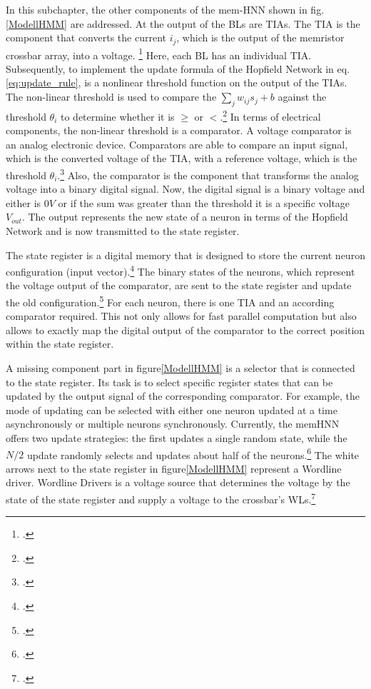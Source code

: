 In this subchapter, the other components of the \ac{mem-HNN} shown in fig.\ref{ModellHMM} are addressed.
At the output of the BLs are \ac{TIA}s.
The \ac{TIA} is the component that converts the current \(i_j\), which is the output of the memristor crossbar array, into a voltage. \footcite[cf.][3]{hizzaniMemristorbasedHardwareAlgorithms2023}
Here, each BL has an individual \ac{TIA}.
Subsequently, to implement the update formula of the Hopfield Network in eq.\eqref{eq:update_rule}, is a nonlinear threshold function on the output of the \ac{TIA}s.
The non-linear threshold is used to compare the \(\sum_j w_{ij} s_j + b\) against the threshold \(\theta_i\) to determine whether it is \(\geq\) or \(<\).\footcite[cf.][18]{caiHarnessingIntrinsicNoise2019}
In terms of electrical components, the non-linear threshold is a comparator. 
A voltage comparator is an analog electronic device.
Comparators are able to compare an input signal, which is the converted voltage of the \ac{TIA}, with a reference voltage, which is the threshold \(\theta_i\).\footcite[cf.][28]{chenApplicationVoltageComparator2021}
Also, the comparator is the component that transforms the analog voltage into a binary digital signal.
Now, the digital signal is a binary voltage and either is \(0V\) or if the sum was greater than the threshold it is a specific voltage \(V_{out}\).
The output represents the new state of a neuron in terms of the Hopfield Network and is now transmitted to the state register.

The state register is a digital memory that is designed to store the current neuron configuration (input vector).\footcite[cf.][18]{caiHarnessingIntrinsicNoise2019}
The binary states of the neurons, which represent the voltage output of the comparator, are sent to the state register and update the old configuration.\footcite[cf.][3]{caiHarnessingIntrinsicNoise2019}
For each neuron, there is one \ac{TIA} and an according comparator required. 
This not only allows for fast parallel computation but also allows to exactly map the digital output of the comparator to the correct position within the state register.

A missing component part in figure\ref{ModellHMM} is a selector that is connected to the state register. 
Its task is to select specific register states that can be updated by the output signal of the corresponding comparator.  
For example, the mode of updating can be selected with either one neuron updated at a time asynchronously or multiple neurons synchronously. 
Currently, the memHNN offers two update strategies: the first updates a single random state, while the \(N/2\) update randomly selects and updates about half of the neurons.\footcite[cf.][3]{hizzaniMemristorbasedHardwareAlgorithms2023}
The white arrows next to the state register in figure\ref{ModellHMM} represent a Wordline driver. 
Wordline Drivers is a voltage source that determines the voltage by the state of the state register and supply a voltage to the crossbar's WLs.\footcite[cf.][18]{caiHarnessingIntrinsicNoise2019}

